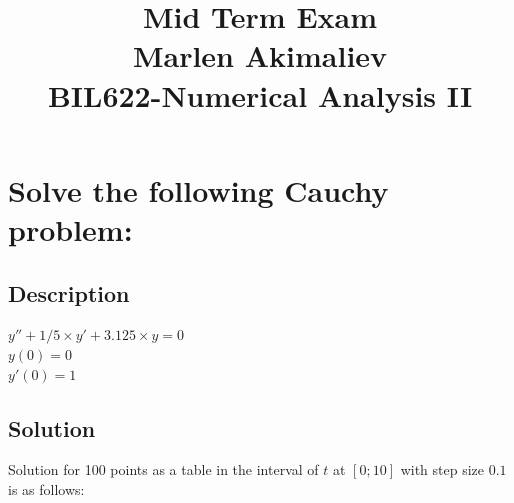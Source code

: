 \documentclass[a4paper,10pt]{article}
\date{\displaydate{date}}
\title{Mid Term Exam\\Marlen Akimaliev\\BIL622-Numerical Analysis II}
\begin{document}
\maketitle

\section{Solve the following Cauchy problem:}
\subsection{Description}
$y''+ 1/5\times y'+ 3.125 \times y = 0$\\
$y(0) = 0$\\
$y'(0) = 1$
\subsection{Solution}
Solution for 100 points as a table in the interval of $t$ at $[0; 10]$ with step size $0.1$ is as follows:
\end{document}
